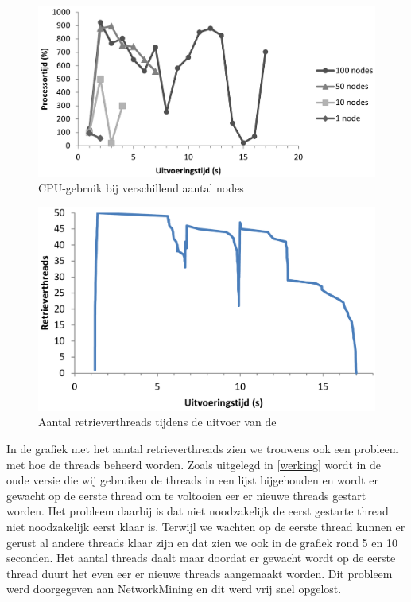 \begin{figure}[h]
	\centering
	\includegraphics[scale=0.40]{figures/cpu-100nodes}
	\caption{CPU-gebruik bij verschillend aantal nodes}
	\label{fig-cpu-aantalnodes}
\end{figure}

\begin{figure}[h]
	\centering
	\includegraphics[scale=0.30]{figures/threads-100nodes}
	\caption{Aantal retrieverthreads tijdens de uitvoer van de \nwmretriever{}}
	\label{fig-retrieverthreads}
\end{figure}

In de grafiek met het aantal retrieverthreads zien we trouwens ook een probleem met hoe de threads beheerd worden.
Zoals uitgelegd in \cref{werking} wordt in de oude versie die wij gebruiken de threads in een lijst bijgehouden en wordt er
gewacht op de eerste thread om te voltooien eer er nieuwe threads gestart worden.
Het probleem daarbij is dat niet noodzakelijk de eerst gestarte thread niet noodzakelijk eerst klaar is.
Terwijl we wachten op de eerste thread kunnen er gerust al andere threads klaar zijn en dat zien we ook in de grafiek rond 5 en 10 seconden.
Het aantal threads daalt maar doordat er gewacht wordt op de eerste thread duurt het even eer er nieuwe threads aangemaakt worden.
Dit probleem werd doorgegeven aan NetworkMining en dit werd vrij snel opgelost.

